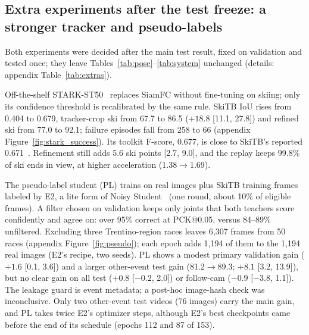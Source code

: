 \documentclass{article}
\begin{document}
\subsection{Extra experiments after the test freeze: a stronger tracker and pseudo-labels}
\label{sec:extra}\label{sec:extra_pl}
Both experiments were decided after the main test result, fixed on validation and tested once; they leave
Tables~\ref{tab:pose}--\ref{tab:system} unchanged (details: appendix Table~\ref{tab:extras}).

Off-the-shelf STARK-ST50~\cite{yan2021learning} replaces SiamFC without fine-tuning on skiing; only its confidence
threshold is recalibrated by the same rule. SkiTB IoU rises from 0.404 to 0.679, tracker-crop ski from 67.7 to 86.5
($+18.8$ [11.1, 27.8]) and refined ski from 77.0 to 92.1; failure episodes fall from 258 to 66 (appendix
Figure~\ref{fig:stark_success}). Its toolkit F-score, 0.677, is close to SkiTB's reported
0.671~\cite{dunnhofer2024tracking}. Refinement still adds 5.6 ski points [2.7, 9.0], and the replay keeps 99.8\% of ski
ends in view, at higher acceleration (1.38$\to$1.69).

The pseudo-label student (PL) trains on real images plus SkiTB training frames labeled by E2, a lite form of Noisy
Student~\cite{xie2020self} (one round, about 10\% of eligible frames). A filter chosen on validation keeps only
joints that both teachers score confidently and agree on: over 95\% correct at PCK@0.05, versus 84--89\% unfiltered.
Excluding three Trentino-region races leaves 6,307 frames from 50 races (appendix Figure~\ref{fig:pseudo}); each
epoch adds 1,194 of them to the 1,194 real images (E2's recipe, two seeds). PL shows a modest primary validation gain
($+1.6$ [0.1, 3.6]) and a larger other-event test gain (81.2$\to$89.3; $+8.1$ [3.2, 13.9]), but no clear gain on all
test ($+0.8$ [$-0.2$, 2.0]) or follow-cam ($-0.9$ [$-3.8$, 1.1]). The leakage guard is event metadata; a post-hoc
image-hash check was inconclusive. Only two other-event test videos (76 images) carry the main gain, and PL takes
twice E2's optimizer steps, although E2's best checkpoints came before the end of its schedule (epochs 112 and 87 of
153).
\end{document}

